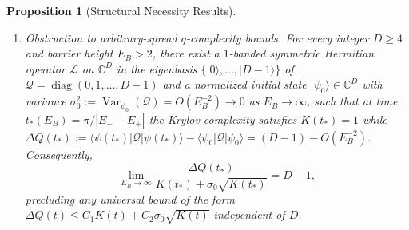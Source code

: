 \documentclass[11pt,a4paper]{article}
\numberwithin{equation}{section}
\theoremstyle{plain}
\newtheorem{proposition}[theorem]{Proposition}
\theoremstyle{definition}
\newcommand{\MSS}{\mathrm{MSS}}
\newcommand{\Var}{\operatorname{Var}}
\begin{document}
\begin{proposition}[Structural Necessity Results]
\begin{enumerate}
  In particular, $\Lambda_\rho^{\MSS}(1) = \Theta(N)$, violating~\eqref{eq:main-H2} for every $\delta\in[0,1)$.
  \item[\emph{(3)}] \emph{Obstruction to arbitrary-spread $q$-complexity bounds.} For every integer $D\ge 4$ and barrier height $E_B > 2$, there exist a $1$-banded symmetric Hermitian operator $\mathcal{L}$ on $\mathbb{C}^D$ in the eigenbasis $\{|0\rangle,\dots,|D-1\rangle\}$ of $\mathcal{Q} = \operatorname{diag}(0,1,\dots,D-1)$ and a normalized initial state $|\psi_0\rangle\in\mathbb{C}^D$ with variance $\sigma_0^2 := \Var_{\psi_0}(\mathcal{Q}) = O(E_B^{-2}) \to 0$ as $E_B\to\infty$, such that at time $t_*(E_B) = \pi/|E_- - E_+|$ the Krylov complexity satisfies $K(t_*) = 1$ while $\Delta Q(t_*) := \langle\psi(t_*)|\mathcal{Q}|\psi(t_*)\rangle - \langle\psi_0|\mathcal{Q}|\psi_0\rangle = (D-1) - O(E_B^{-2})$. Consequently,
  \begin{equation}\label{eq:doublewell-ratio}
    \lim_{E_B\to\infty} \frac{\Delta Q(t_*)}{K(t_*) + \sigma_0\sqrt{K(t_*)}} = D - 1,
  \end{equation}
  precluding any universal bound of the form $\Delta Q(t) \le C_1 K(t) + C_2 \sigma_0\sqrt{K(t)}$ independent of $D$.
\end{enumerate}
\end{proposition}
\end{document}
